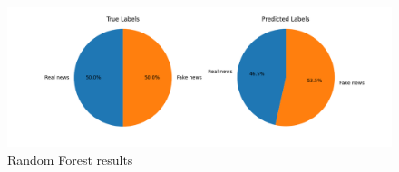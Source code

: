 \documentclass[10pt,twocolumn,letterpaper]{article}
\begin{document}
\begin{figure}[h]
   \begin{center}
        \includegraphics[scale=0.6]{graphs/RF/piechart.png}
   \end{center}
\vspace*{-5mm}
\caption{Random Forest results \label{piechart_3}}
\end{figure}
\end{document}

